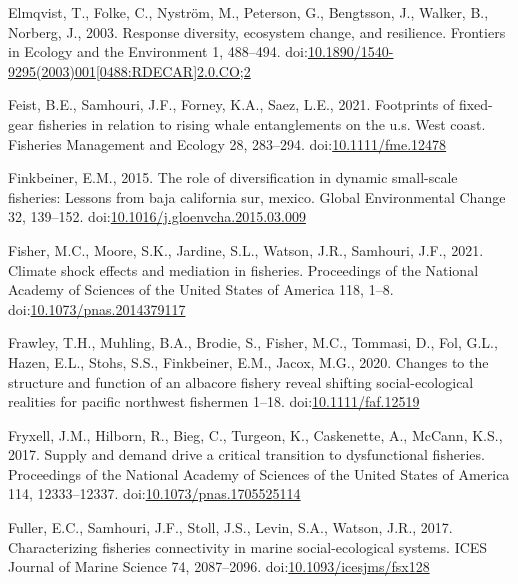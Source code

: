 \documentclass[]{elsarticle} %
\begin{document}
\leavevmode\hypertarget{ref-Elmqvist2003a}{}%
Elmqvist, T., Folke, C., Nyström, M., Peterson, G., Bengtsson, J.,
Walker, B., Norberg, J., 2003. Response diversity, ecosystem change, and
resilience. Frontiers in Ecology and the Environment 1, 488--494.
doi:\href{https://doi.org/10.1890/1540-9295(2003)001\%5B0488:RDECAR\%5D2.0.CO;2}{10.1890/1540-9295(2003)001{[}0488:RDECAR{]}2.0.CO;2}

\leavevmode\hypertarget{ref-Feist2021}{}%
Feist, B.E., Samhouri, J.F., Forney, K.A., Saez, L.E., 2021. Footprints
of fixed-gear fisheries in relation to rising whale entanglements on the
u.s. West coast. Fisheries Management and Ecology 28, 283--294.
doi:\href{https://doi.org/10.1111/fme.12478}{10.1111/fme.12478}

\leavevmode\hypertarget{ref-Finkbeiner2015}{}%
Finkbeiner, E.M., 2015. The role of diversification in dynamic
small-scale fisheries: Lessons from baja california sur, mexico. Global
Environmental Change 32, 139--152.
doi:\href{https://doi.org/10.1016/j.gloenvcha.2015.03.009}{10.1016/j.gloenvcha.2015.03.009}

\leavevmode\hypertarget{ref-Fisher2021}{}%
Fisher, M.C., Moore, S.K., Jardine, S.L., Watson, J.R., Samhouri, J.F.,
2021. Climate shock effects and mediation in fisheries. Proceedings of
the National Academy of Sciences of the United States of America 118,
1--8.
doi:\href{https://doi.org/10.1073/pnas.2014379117}{10.1073/pnas.2014379117}

\leavevmode\hypertarget{ref-Frawley2020}{}%
Frawley, T.H., Muhling, B.A., Brodie, S., Fisher, M.C., Tommasi, D.,
Fol, G.L., Hazen, E.L., Stohs, S.S., Finkbeiner, E.M., Jacox, M.G.,
2020. Changes to the structure and function of an albacore fishery
reveal shifting social-ecological realities for pacific northwest
fishermen 1--18.
doi:\href{https://doi.org/10.1111/faf.12519}{10.1111/faf.12519}

\leavevmode\hypertarget{ref-Fryxell2017}{}%
Fryxell, J.M., Hilborn, R., Bieg, C., Turgeon, K., Caskenette, A.,
McCann, K.S., 2017. Supply and demand drive a critical transition to
dysfunctional fisheries. Proceedings of the National Academy of Sciences
of the United States of America 114, 12333--12337.
doi:\href{https://doi.org/10.1073/pnas.1705525114}{10.1073/pnas.1705525114}

\leavevmode\hypertarget{ref-Fuller2017}{}%
Fuller, E.C., Samhouri, J.F., Stoll, J.S., Levin, S.A., Watson, J.R.,
2017. Characterizing fisheries connectivity in marine social-ecological
systems. ICES Journal of Marine Science 74, 2087--2096.
doi:\href{https://doi.org/10.1093/icesjms/fsx128}{10.1093/icesjms/fsx128}
\end{document}
